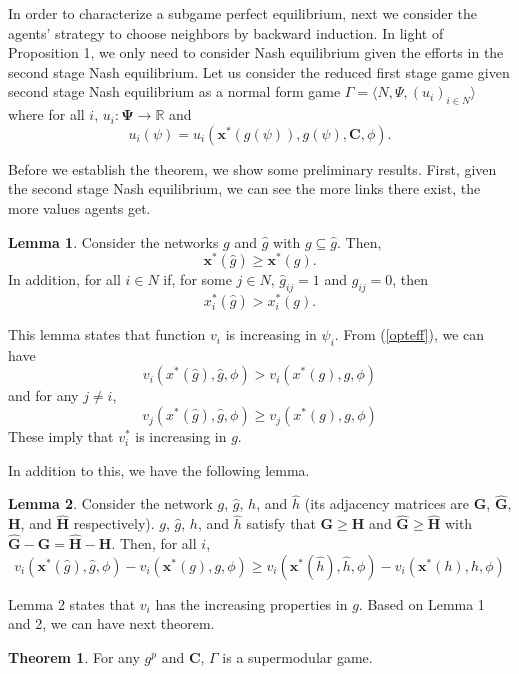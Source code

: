 \documentclass[12pt]{article}
\theoremstyle{definition}
\newtheorem{theorem}{Theorem}
\newtheorem{lemma}{Lemma}
\newcommand{\bm}[1]{\boldsymbol{#1}}
\begin{document}
In order to characterize a subgame perfect equilibrium, next we consider the agents' strategy to choose neighbors by backward induction.
In light of Proposition 1, we only need to consider Nash equilibrium given the efforts in the second stage Nash equilibrium.
Let us consider the reduced first stage game given second stage Nash equilibrium as a normal form game $\Gamma = \langle N, \Psi, {(u_i)}_{i \in N} \rangle$ where for all $i$, $u_i : \bm{\Psi} \rightarrow \mathbb{R}$ and
\[ u_i(\psi) = u_i(\bm{x}^*(g(\psi)), g(\psi), \bm{C}, \phi). \]

Before we establish the theorem, we show some preliminary results.
First, given the second stage Nash equilibrium, we can see the more links there exist, the more values agents get.

\begin{lemma}
	Consider the networks $g$ and $\hat{g}$ with $g \subseteq \hat{g}$.
	Then,
	\[ \bm{x}^*(\hat{g}) \ge \bm{x}^*(g). \]
	In addition, for all $i \in N$ if, for some $j \in N$, $\hat{g}_{ij} = 1$ and $g_{ij} = 0$, then
	\[ x_i^*(\hat{g}) > x_i^*(g). \]
\end{lemma}

This lemma states that function $v_i$ is increasing in $\psi_i$.
From (\ref{opteff}), we can have 
\[ v_i(x^*(\hat{g}), \hat{g}, \phi) > v_i(x^*(g), g, \phi)\]
and for any $j \neq i$,
\[ v_j(x^*(\hat{g}), \hat{g}, \phi) \ge v_j(x^*(g), g, \phi)\]
These imply that $v_i^*$ is increasing in $g$.

In addition to this, we have the following lemma.

\begin{lemma}
	Consider the network $g$, $\hat{g}$, $h$, and $\hat{h}$ (its adjacency matrices are $\bm{G}$, $\bm{\hat{G}}$, $\bm{H}$, and $\bm{\hat{H}}$ respectively).
	$g$, $\hat{g}$, $h$, and $\hat{h}$ satisfy that $\bm{G} \ge \bm{H}$ and  $\bm{\hat{G}} \ge \bm{\hat{H}}$ with $\bm{\hat{G}} - \bm{G} = \bm{\hat{H}} - \bm{H}$.
	Then, for all $i$,
	\[ v_i(\bm{x}^*(\hat{g}), \hat{g}, \phi) - v_i(\bm{x}^*(g), g, \phi) \ge v_i(\bm{x}^*(\hat{h}), \hat{h}, \phi) - v_i(\bm{x}^*(h), h, \phi)\]
\end{lemma}

Lemma 2 states that $v_i$ has the increasing properties in $g$.
Based on Lemma 1 and 2, we can have next theorem.

\begin{theorem}
	For any $g^p$ and $\bm{C}$, $\Gamma$ is a supermodular game.
\end{theorem}
\end{document}
